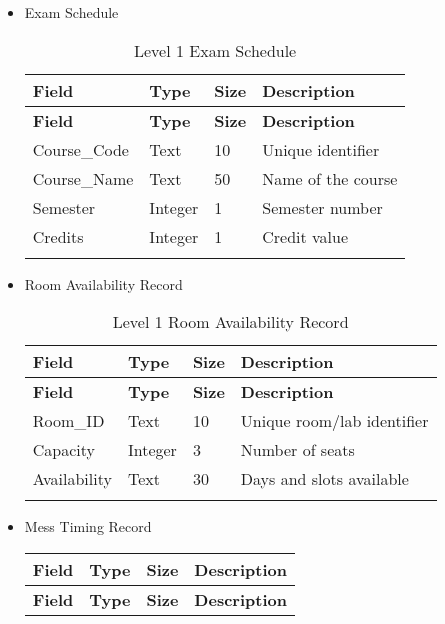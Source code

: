 \documentclass[a4paper,12pt]{article}
\begin{document}
\begin{itemize}
\item Exam Schedule
\begin{longtable}{|p{3cm}|p{2cm}|p{1.5cm}|p{6cm}|}
\hline
\textbf{Field} & \textbf{Type} & \textbf{Size} & \textbf{Description} \\
\hline
\endfirsthead

\hline
\textbf{Field} & \textbf{Type} & \textbf{Size} & \textbf{Description} \\
\hline
\endhead

\hline
\endfoot

\hline
\endlastfoot

Course\_Code & Text & 10 & Unique identifier \\
\hline
Course\_Name & Text & 50 & Name of the course \\
\hline
Semester & Integer & 1 & Semester number \\
\hline
Credits & Integer & 1 & Credit value \\
\hline
\caption{Level 1 Exam Schedule}
\label{tag:placeholder}
\end{longtable}

\newpage
\item {Room Availability Record}
\begin{longtable}{|p{3cm}|p{2cm}|p{1.5cm}|p{6cm}|}
\hline
\textbf{Field} & \textbf{Type} & \textbf{Size} & \textbf{Description} \\
\hline
\endfirsthead

\hline
\textbf{Field} & \textbf{Type} & \textbf{Size} & \textbf{Description} \\
\hline
\endhead

\hline
\endfoot

\hline
\endlastfoot

Room\_ID & Text & 10 & Unique room/lab identifier \\
\hline
Capacity & Integer & 3 & Number of seats \\
\hline
Availability & Text & 30 & Days and slots available \\
\hline
\caption{Level 1 Room Availability Record}
\label{tag:placeholder}
\end{longtable}

\item {Mess Timing Record}
\begin{longtable}{|p{3cm}|p{2cm}|p{1.5cm}|p{6cm}|}
\hline
\textbf{Field} & \textbf{Type} & \textbf{Size} & \textbf{Description} \\
\hline
\endfirsthead

\hline
\textbf{Field} & \textbf{Type} & \textbf{Size} & \textbf{Description} \\
\hline
\endhead


\end{longtable}
\end{itemize}
\end{document}
